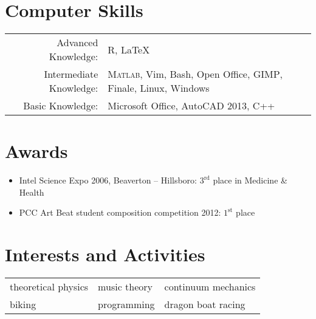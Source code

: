 \documentclass[letterpaper]{article}
\begin{document}

\section{Computer Skills}
\begin{center}
\begin{tabular}{rl}
Advanced Knowledge: & R, {\LaTeX}	\\

Intermediate Knowledge: & \textsc{Matlab}, Vim, Bash, Open Office, \textsc{GIMP}, Finale, Linux, Windows	\\

Basic Knowledge: & Microsoft Office, AutoCAD 2013, C++	\\
\end{tabular}
\end{center}


\section{Awards}
\begin{center}
\begin{itemize}
\item Intel Science Expo 2006, Beaverton – Hillsboro: $3^\text{rd}$ place in Medicine \& Health
\item PCC Art Beat student composition competition 2012: $1^\text{st}$ place
\end{itemize}
\end{center}


\section{Interests and Activities}
\begin{center}
\begin{tabular}{lll}
theoretical physics & music theory & continuum mechanics	\\
biking & programming & dragon boat racing
\end{tabular}
\end{center}
\end{document}
